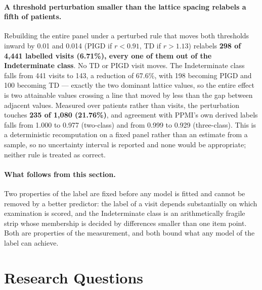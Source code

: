 \documentclass[11pt]{article}
\begin{document}
\paragraph{A threshold perturbation smaller than the lattice spacing relabels a
fifth of patients.} Rebuilding the entire panel under a perturbed rule that moves
both thresholds inward by 0.01 and 0.014 (PIGD if $r < 0.91$, TD if $r > 1.13$)
relabels \textbf{298 of 4,441 labelled visits (6.71\%), every one of them out of
the Indeterminate class}. No TD or PIGD visit moves. The Indeterminate class
falls from 441 visits to 143, a reduction of 67.6\%, with 198 becoming PIGD and
100 becoming TD --- exactly the two dominant lattice values, so the entire effect
is two attainable values crossing a line that moved by less than the gap between
adjacent values. Measured over patients rather than visits, the perturbation
touches \textbf{235 of 1,080 (21.76\%)}, and agreement with PPMI's own derived
labels falls from 1.000 to 0.977 (two-class) and from 0.999 to 0.929
(three-class). This is a deterministic recomputation on a fixed panel rather than
an estimate from a sample, so no uncertainty interval is reported and none would
be appropriate; neither rule is treated as correct.

\begin{table}[t]
\centering
\caption{Audits of the label's construction. Panels (a) and (b) establish that the
label is reproduced exactly from the items but depends heavily on which
examination is scored; panels (c) and (d) establish that the Indeterminate band
is narrower than the resolution of the quantity it is applied to.}
\label{tab:construction}
\small

\end{table}

\paragraph{What follows from this section.} Two properties of the label are fixed
before any model is fitted and cannot be removed by a better predictor: the label
of a visit depends substantially on which examination is scored, and the
Indeterminate class is an arithmetically fragile strip whose membership is
decided by differences smaller than one item point. Both are properties of the
measurement, and both bound what any model of the label can achieve.

\section{Research Questions}
\end{document}
